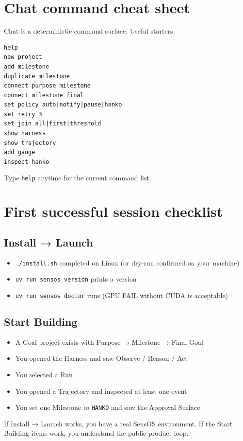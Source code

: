 \documentclass[11pt,a4paper,oneside]{article}
\newcommand{\checkitem}[1]{\item[\textcolor{SensAccent}{$\square$}] #1}
\newcommand{\pathcode}[1]{\texttt{#1}}
\begin{document}
\section{Chat command cheat sheet}
\label{sec:chat}

Chat is a deterministic command surface. Useful starters:

\begin{lstlisting}
help
new project
add milestone
duplicate milestone
connect purpose milestone
connect milestone final
set policy auto|notify|pause|hanko
set retry 3
set join all|first|threshold
show harness
show trajectory
add gauge
inspect hanko
\end{lstlisting}

Type \pathcode{help} anytime for the current command list.

\section{First successful session checklist}
\label{sec:checklist}

\subsection*{Install → Launch}

\begin{itemize}[label={}]
  \checkitem{\pathcode{./install.sh} completed on Linux (or dry-run confirmed on your machine)}
  \checkitem{\pathcode{uv run sensos version} prints a version}
  \checkitem{\pathcode{uv run sensos doctor} runs (GPU FAIL without CUDA is acceptable)}
\end{itemize}

\subsection*{Start Building}

\begin{itemize}[label={}]
  \checkitem{A Goal project exists with Purpose → Milestone → Final Goal}
  \checkitem{You opened the Harness and saw Observe / Reason / Act}
  \checkitem{You selected a Run}
  \checkitem{You opened a Trajectory and inspected at least one event}
  \checkitem{You set one Milestone to \pathcode{HANKO} and saw the Approval Surface}
\end{itemize}

If Install → Launch works, you have a real SensOS environment. If the Start Building items work, you understand the public product loop.
\end{document}
